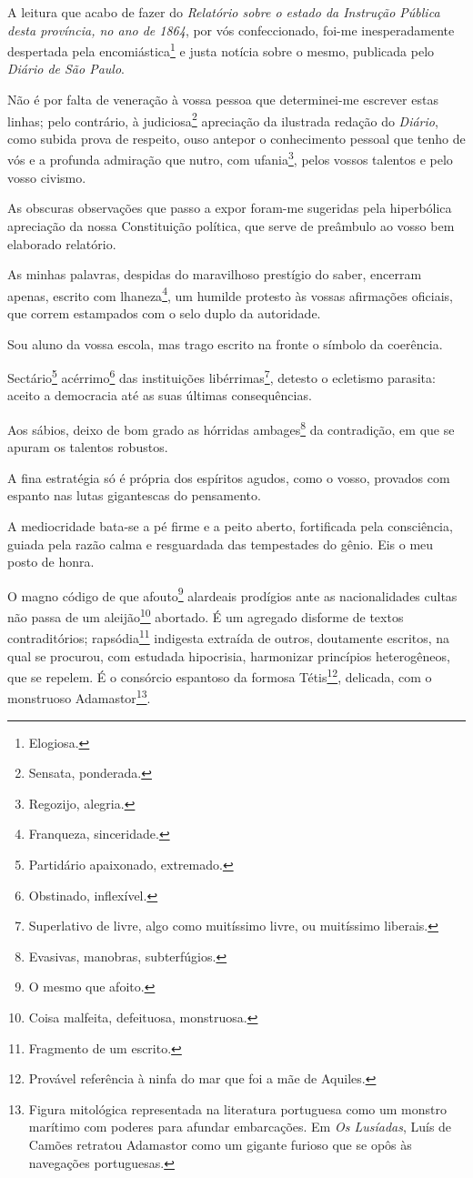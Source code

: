 A leitura que acabo de fazer do \emph{Relatório sobre o estado da
Instrução Pública desta província, no ano de 1864}, por vós
confeccionado, foi-me inesperadamente despertada pela
encomiástica\footnote{Elogiosa.} e justa notícia sobre o mesmo,
publicada pelo \emph{Diário de São Paulo}.

Não é por falta de veneração à vossa pessoa que determinei-me escrever
estas linhas; pelo contrário, à judiciosa\footnote{Sensata, ponderada.}
apreciação da ilustrada redação do \emph{Diário}, como subida prova de
respeito, ouso antepor o conhecimento pessoal que tenho de vós e a
profunda admiração que nutro, com ufania\footnote{Regozijo, alegria.},
pelos vossos talentos e pelo vosso civismo.

As obscuras observações que passo a expor foram-me sugeridas pela
hiperbólica apreciação da nossa Constituição política, que serve de
preâmbulo ao vosso bem elaborado relatório.

As minhas palavras, despidas do maravilhoso prestígio do saber, encerram
apenas, escrito com lhaneza\footnote{Franqueza, sinceridade.}, um
humilde protesto às vossas afirmações oficiais, que correm estampados
com o selo duplo da autoridade.

Sou aluno da vossa escola, mas trago escrito na fronte o símbolo da
coerência.

Sectário\footnote{Partidário apaixonado, extremado.}
acérrimo\footnote{Obstinado, inflexível.} das instituições
libérrimas\footnote{Superlativo de livre, algo como muitíssimo livre,
  ou muitíssimo liberais.}, detesto o ecletismo parasita: aceito a
democracia até as suas últimas consequências.

Aos sábios, deixo de bom grado as hórridas ambages\footnote{Evasivas,
  manobras, subterfúgios.} da contradição, em que se apuram os talentos
robustos.

A fina estratégia só é própria dos espíritos agudos, como o vosso,
provados com espanto nas lutas gigantescas do pensamento.

A mediocridade bata-se a pé firme e a peito aberto, fortificada pela
consciência, guiada pela razão calma e resguardada das tempestades do
gênio. Eis o meu posto de honra.

O magno código de que afouto\footnote{O mesmo que afoito.} alardeais
prodígios ante as nacionalidades cultas não passa de um
aleijão\footnote{Coisa malfeita, defeituosa, monstruosa.} abortado. É
um agregado disforme de textos contraditórios; rapsódia\footnote{
  Fragmento de um escrito.} indigesta extraída de outros, doutamente
escritos, na qual se procurou, com estudada hipocrisia, harmonizar
princípios heterogêneos, que se repelem. É o consórcio espantoso da
formosa Tétis\footnote{Provável referência à ninfa do mar que foi a
  mãe de Aquiles.}, delicada, com o monstruoso Adamastor\footnote{
  Figura mitológica representada na literatura portuguesa como um
  monstro marítimo com poderes para afundar embarcações. Em \emph{Os
  Lusíadas}, Luís de Camões retratou Adamastor como um gigante furioso
  que se opôs às navegações portuguesas.}.

